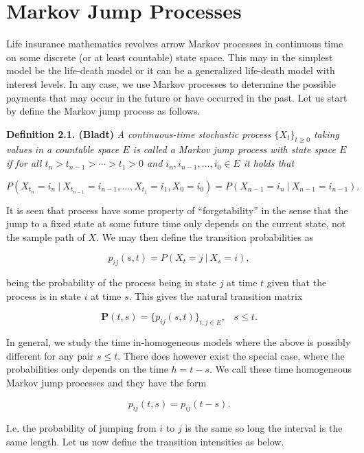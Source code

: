 \documentclass[a4paper,10pt,openany]{book}
\begin{document}
\hypertarget{markov-jump-processes}{%
\section{Markov Jump Processes}\label{markov-jump-processes}}

Life insurance mathematics revolves arrow Markov processes in continuous time on some discrete (or at least countable) state space. This may in the simplest model be the life-death model or it can be a generalized life-death model with interest levels. In any case, we use Markov processes to determine the possible payments that may occur in the future or have occurred in the past. Let us start by define the Markov jump process as follows.

\textbf{Definition 2.1. (Bladt)} \emph{A continuous-time stochastic process \(\{X_t\}_{t\ge 0}\) taking values in a countable space \(E\) is called a Markov jump process with state space \(E\) if for all \(t_n>t_{n-1}>\cdots > t_1>0\) and \(i_n,i_{n-1},...,i_0\in E\) it holds that}

\[
P(X_{t_n}=i_n \ \vert\ X_{t_{n-1}}=i_{n-1},...,X_{t_1}=i_1,X_0=i_0)=P(X_{n-1}=i_n\ \vert\ X_{n-1}=i_{n-1}).
\]

It is seen that process have some property of ``forgetability'' in the sense that the jump to a fixed state at some future time only depends on the current state, not the sample path of \(X\). We may then define the transition probabilities as

\[
p_{ij}(s,t)=P(X_t=j\ \vert\ X_s=i),
\]

being the probability of the process being in state \(j\) at time \(t\) given that the process is in state \(i\) at time \(s\). This gives the natural transition matrix

\[
\mathbf{P}(t,s)=\big\{p_{ij}(s,t)\big\}_{i,j\in E},\hspace{10pt} s\le t.
\]

In general, we study the time in-homogeneous models where the above is possibly different for any pair \(s\le t\). There does however exist the special case, where the probabilities only depends on the time \(h=t-s\). We call these time homogeneous Markov jump processes and they have the form

\[
p_{ij}(t,s)=p_{ij}(t-s).
\]

I.e. the probability of jumping from \(i\) to \(j\) is the same so long the interval is the same length. Let us now define the transition intensities as below.
\end{document}
